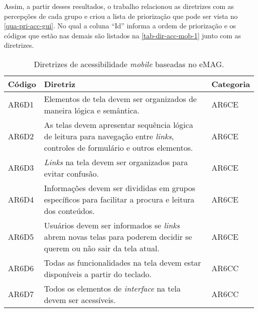 Assim, a partir desses resultados, o trabalho relacionou as diretrizes com as percepções de cada grupo
e criou a lista de priorização que pode ser vista no \autoref{qua-pri-acc-gui}.
No qual a coluna ``Id'' informa a ordem de priorização e os códigos que estão nas demais são listados na \autoref{tab-dir-acc-mob-1} junto com as diretrizes.

\begin{table}[htb]
  \begin{center}
    \ABNTEXfontereduzida
    \caption{Diretrizes de acessibilidade \emph{mobile} baseadas no eMAG.}
    \label{tab-dir-acc-mob-1}
    \begin{tabular}{p{1.2cm}|p{12.0cm}|p{1.5cm}}
      \textbf{Código} & \textbf{Diretriz}                                                                                                                            & \textbf{Categoria} \\
      \hline
      AR6D1           & Elementos de tela devem ser organizados de maneira lógica e semântica.                                                                       & AR6CE              \\
      \hline
      AR6D2           & As telas devem apresentar sequência lógica de leitura para navegação entre \emph{links}, controles de formulário e outros elementos.         & AR6CE              \\
      \hline
      AR6D3           & \emph{Links} na tela devem ser organizados para evitar confusão.                                                                             & AR6CE              \\
      \hline
      AR6D4           & Informações devem ser divididas em grupos específicos para facilitar a procura e leitura dos conteúdos.                                      & AR6CE              \\
      \hline
      AR6D5           & Usuários devem ser informados se \emph{links} abrem novas telas para poderem decidir se querem ou não sair da tela atual.                    & AR6CE              \\
      \hline
      AR6D6           & Todas as funcionalidades na tela devem estar disponíveis a partir do teclado.                                                                & AR6CC              \\
      \hline
      AR6D7           & Todos os elementos de \emph{interface} na tela devem ser acessíveis.                                                                         & AR6CC              \\

\end{tabular}
\end{center}
\end{table}
